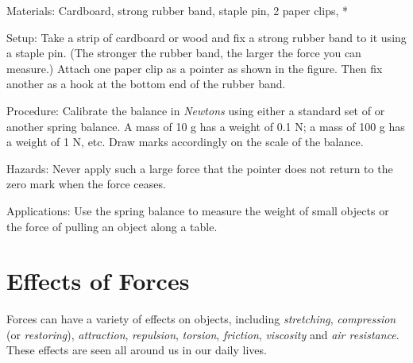 \begin{multicols}{2}
\begin{description*}
\item[Materials:]{Cardboard, strong rubber band, staple pin, 2 paper clips, *}
\item[Setup:]{Take a strip of cardboard or wood and fix a strong rubber band to it using a staple pin. (The stronger the rubber band, the larger the force you can measure.) Attach one paper clip as a pointer as shown in the figure. Then fix another as a hook at the bottom end of the rubber band.}
\item[Procedure:]{Calibrate the balance in \emph{Newtons} using either a standard set of  or another spring balance. A mass of 10 g has a weight of 0.1 N; a mass of 100 g has a weight of 1 N, etc. Draw marks accordingly on the scale of the balance.}
\item[Hazards:]{Never apply such a large force that the pointer does not return to the zero mark when the force ceases.}
\item[Applications:]{Use the spring balance to measure the weight of small objects or the force of pulling an object along a table.}
\end{description*}


\section*{Effects of Forces}
Forces can have a variety of effects on objects, including \emph{stretching}, \emph{compression} (or \emph{restoring}), \emph{attraction}, \emph{repulsion}, \emph{torsion}, \emph{friction}, \emph{viscosity} and \emph{air resistance}. These effects are seen all around us in our daily lives.



\end{multicols}
